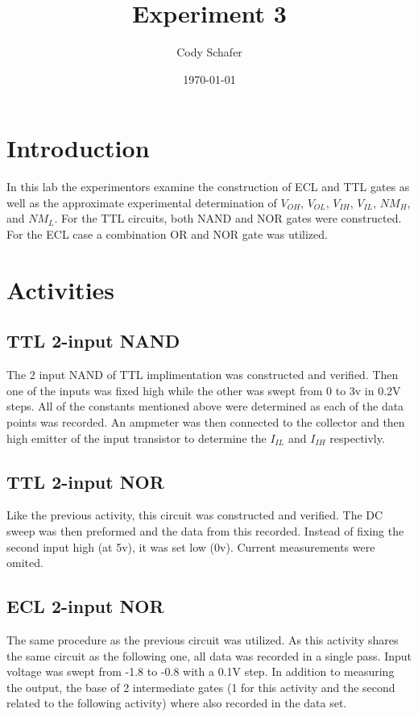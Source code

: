 \documentclass[10pt]{article}
\title{Experiment 3}
\author{Cody Schafer}
\date{\today}
\begin{document}
\maketitle
\section{Introduction}

In this lab the experimentors examine the construction of ECL and TTL
gates as well as the approximate experimental determination of $V_{OH}$,
$V_{OL}$, $V_{IH}$, $V_{IL}$, $NM_{H}$, and $NM_{L}$. For the TTL
circuits, both NAND and NOR gates were constructed. For the ECL case a
combination OR and NOR gate was utilized.

\section{Activities}

\subsection{TTL 2-input NAND}

The 2 input NAND of TTL implimentation was constructed and verified. Then
one of the inputs was fixed high while the other was swept from 0 to 3v in
0.2V steps. All of the constants mentioned above were determined as each
of the data points was recorded. An ampmeter was then connected to the
collector and then high emitter of the input transistor to determine the
$I_{IL}$ and $I_{IH}$ respectivly.

\subsection{TTL 2-input NOR}

Like the previous activity, this circuit was constructed and verified. The
DC sweep was then preformed and the data from this recorded. Instead of
fixing the second input high (at 5v), it was set low (0v). Current
measurements were omited.

\subsection{ECL 2-input NOR}

The same procedure as the previous circuit was utilized. As this activity
shares the same circuit as the following one, all data was recorded in a
single pass. Input voltage was swept from -1.8 to -0.8 with a 0.1V step.
In addition to measuring the output, the base of 2 intermediate gates (1
for this activity and the second related to the following activity)
where also recorded in the data set.
\end{document}

